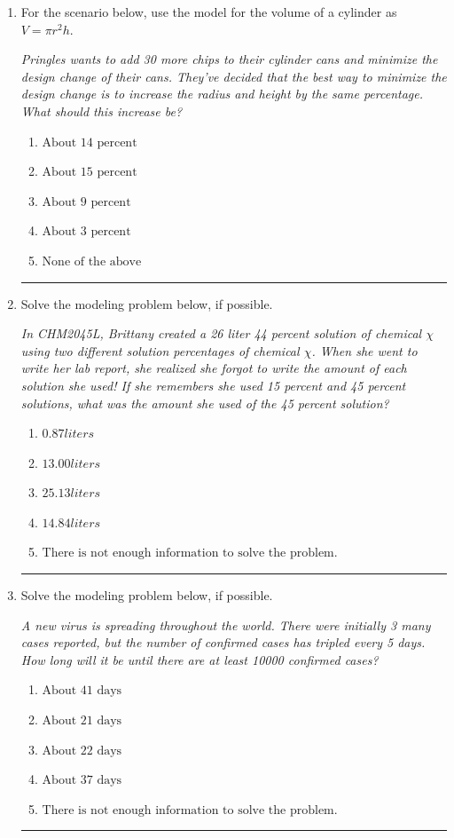 \documentclass[14pt]{extbook}
\newcommand{\litem}[1]{\item#1\hspace*{-1cm}\rule{\textwidth}{0.4pt}}
\begin{document}
\begin{enumerate}
{\begin{enumerate}[label=\Alph*.]
\end{enumerate} }
\litem{
For the scenario below, use the model for the volume of a cylinder as $V = \pi r^2 h$.
\begin{center}
    \textit{ Pringles wants to add 30 \text{percent} more chips to their cylinder cans and minimize the design change of their cans. They've decided that the best way to minimize the design change is to increase the radius and height by the same percentage. What should this increase be? }
\end{center}
\begin{enumerate}[label=\Alph*.]
\item \( \text{About } 14 \text{ percent} \)
\item \( \text{About } 15 \text{ percent} \)
\item \( \text{About } 9 \text{ percent} \)
\item \( \text{About } 3 \text{ percent} \)
\item \( \text{None of the above} \)

\end{enumerate} }
\litem{
Solve the modeling problem below, if possible.
\begin{center}
    \textit{ In CHM2045L, Brittany created a 26 liter 44 percent solution of chemical $\chi$ using two different solution percentages of chemical $\chi$. When she went to write her lab report, she realized she forgot to write the amount of each solution she used! If she remembers she used 15 percent and 45 percent solutions, what was the amount she used of the 45 percent solution? }
\end{center}
\begin{enumerate}[label=\Alph*.]
\item \( 0.87 liters \)
\item \( 13.00 liters \)
\item \( 25.13 liters \)
\item \( 14.84 liters \)
\item \( \text{There is not enough information to solve the problem.} \)

\end{enumerate} }
\litem{
Solve the modeling problem below, if possible.
\begin{center}
    \textit{ A new virus is spreading throughout the world. There were initially 3 many cases reported, but the number of confirmed cases has tripled every 5 days. How long will it be until there are at least 10000 confirmed cases? }
\end{center}
\begin{enumerate}[label=\Alph*.]
\item \( \text{About } 41 \text{ days} \)
\item \( \text{About } 21 \text{ days} \)
\item \( \text{About } 22 \text{ days} \)
\item \( \text{About } 37 \text{ days} \)
\item \( \text{There is not enough information to solve the problem.} \)


\end{enumerate}}
\end{enumerate}
\end{document}

